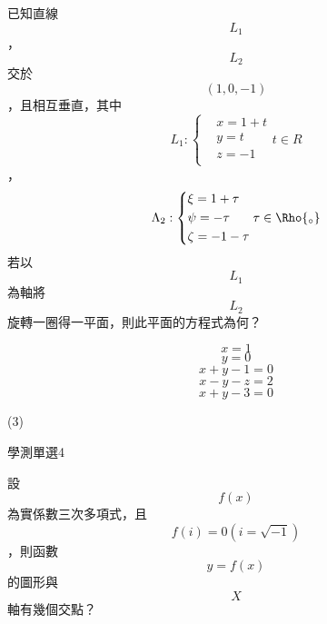 \begin{QUESTIONS}
\begin{QUESTION}
        \begin{ExamAnsRateInfo}{}{}{}{}
        \end{ExamAnsRateInfo}
        \begin{QBODY}
            已知直線\[{{L}_{1}}\]，\[{{L}_{2}}\]交於\[\left( 1,0,-1 \right)\]，且相互垂直，其中
            \[{{L}_{1}}:\left\{ \begin{aligned}
            & x=1+t \\ 
            & y=t \\ 
            & z=-1 \\ 
            \end{aligned} \right.t\in R\]，	\[{{\Lambda }_{2}}:\left\{ \begin{aligned}
            & \xi =1+\tau  \\ 
            & \psi =-\tau  \\ 
            & \zeta =-1-\tau  \\ 
            \end{aligned} \right.\tau \in \Rho {{}_{\circ }}\]
            若以\[{{L}_{1}}\]為軸將\[{{L}_{2}}\]旋轉一圈得一平面，則此平面的方程式為何？
            \begin{QOPS} 
 \QOP\[x=1\]	
            \QOP\[y=0\]	
            \QOP\[x+y-1=0\]
            \QOP\[x-y-z=2\]	
            \QOP\[x+y-3=0\]
            \end{QOPS}
        \end{QBODY}
        \begin{QFROMS}
        \end{QFROMS}
        \begin{QTAGS}\end{QTAGS}
        \begin{QANS}
            (3)
        \end{QANS}
        \begin{QSOLLIST}
        \end{QSOLLIST}
        \begin{QEMPTYSPACE}
        \end{QEMPTYSPACE}
    \end{QUESTION}
    \begin{QUESTION}
        \begin{ExamInfo}{85}{學測}{單選}{4}
        \end{ExamInfo}
        \begin{ExamAnsRateInfo}{}{}{}{}
        \end{ExamAnsRateInfo}
        \begin{QBODY}
            設\[f\left( x \right)\]為實係數三次多項式，且\[f\left( i \right)=0\left( i=\sqrt{-1} \right)\]，則函數\[y=f\left( x \right)\]的圖形與\[X\]軸有幾個交點？

\end{QBODY}
\end{QUESTION}
\end{QUESTIONS}
